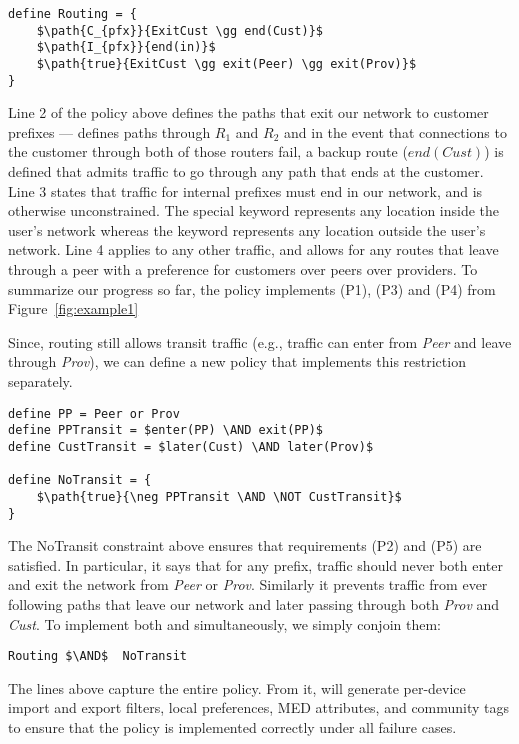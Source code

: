 \begin{lstlisting}[mathescape=true]
define Routing = {
    $\path{C_{pfx}}{ExitCust \gg end(Cust)}$
    $\path{I_{pfx}}{end(in)}$
    $\path{true}{ExitCust \gg exit(Peer) \gg exit(Prov)}$
}
\end{lstlisting}

Line 2 of the policy above
defines the paths that exit our network to customer prefixes ---
 defines paths through $R_1$ and $R_2$ and in the event
that connections to the customer through both of those routers fail,
a backup route ($end(Cust)$) is defined that admits traffic to go through
any path that ends at the customer.
Line 3 states that traffic for internal prefixes must end in our network, and is otherwise unconstrained.  The special keyword  represents any location
inside the user's network whereas the keyword  represents any location
outside the user's network.
Line 4 applies to any other traffic, and allows for any routes that leave through a peer with a preference for customers over peers over providers. To summarize our progress so far, the  policy
implements (P1), (P3) and (P4) from Figure~\ref{fig:example1}

Since, routing still allows transit traffic (e.g., traffic can enter from \textit{Peer} and leave through \textit{Prov}), we can define a new policy that
implements this restriction separately.

\begin{lstlisting}[mathescape=true]
define PP = Peer or Prov
define PPTransit = $enter(PP) \AND exit(PP)$
define CustTransit = $later(Cust) \AND later(Prov)$

define NoTransit = {
    $\path{true}{\neg PPTransit \AND \NOT CustTransit}$
}
\end{lstlisting}

The \textsf{NoTransit} constraint above ensures that requirements (P2) and (P5) are satisfied. In particular, it says that for any prefix, traffic should never both enter and exit the network from \textit{Peer} or \textit{Prov}. Similarly it prevents traffic from ever following paths that leave our network and later passing through both \textit{Prov} and \textit{Cust}.  To implement both 
and  simultaneously, we simply conjoin them:

\begin{lstlisting}[mathescape=true]
Routing $\AND$  NoTransit
\end{lstlisting}

The lines above capture the entire policy. From it, \sysname will generate per-device import and export filters, local preferences,
MED attributes, and community tags to ensure that the policy is
implemented correctly under all failure cases.

